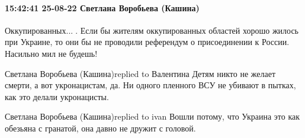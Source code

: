  
 
 
 
 


\paragraph{15:42:41 25-08-22 Светлана Воробьева (Кашина)}

Оккупированных...🙂. Если бы жителям оккупированных областей хорошо жилось при Украине, то они бы не проводили референдум о присоединении к России. Насильно мил не будешь!

Светлана Воробьева (Кашина)replied to Валентина
Детям никто не желает смерти, а вот укронацистам, да. Ни одного пленного ВСУ не убивают в пытках, как это делали укронацисты.

Светлана Воробьева (Кашина)replied to ivan
Вошли потому, что Украина это как обезьяна с гранатой, она давно не дружит с головой.
